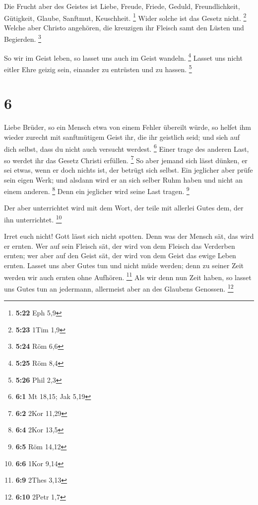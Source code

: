  Die Frucht aber des Geistes ist Liebe, Freude, Friede,
Geduld, Freundlichkeit, Gütigkeit, Glaube, Sanftmut, Keuschheit.
\footnote{\textbf{5:22} Eph 5,9}  Wider solche ist das
Gesetz nicht. \footnote{\textbf{5:23} 1Tim 1,9}  Welche
aber Christo angehören, die kreuzigen ihr Fleisch samt den Lüsten und
Begierden. \footnote{\textbf{5:24} Röm 6,6}

 So wir im Geist leben, so lasset uns auch im Geist
wandeln. \footnote{\textbf{5:25} Röm 8,4}  Lasset uns nicht
eitler Ehre geizig sein, einander zu entrüsten und zu hassen.
\footnote{\textbf{5:26} Phil 2,3}

\hypertarget{section-1}{%
\section{6}\label{section-1}}

 Liebe Brüder, so ein Mensch etwa von einem Fehler übereilt
würde, so helfet ihm wieder zurecht mit sanftmütigem Geist ihr, die ihr
geistlich seid; und sieh auf dich selbst, dass du nicht auch versucht
werdest. \footnote{\textbf{6:1} Mt 18,15; Jak 5,19}  Einer
trage des anderen Last, so werdet ihr das Gesetz Christi erfüllen.
\footnote{\textbf{6:2} 2Kor 11,29}  So aber jemand sich
lässt dünken, er sei etwas, wenn er doch nichts ist, der betrügt sich
selbst.  Ein jeglicher aber prüfe sein eigen Werk; und
alsdann wird er an sich selber Ruhm haben und nicht an einem anderen.
\footnote{\textbf{6:4} 2Kor 13,5}  Denn ein jeglicher wird
seine Last tragen. \footnote{\textbf{6:5} Röm 14,12}

 Der aber unterrichtet wird mit dem Wort, der teile mit
allerlei Gutes dem, der ihn unterrichtet. \footnote{\textbf{6:6} 1Kor
  9,14}

 Irret euch nicht! Gott lässt sich nicht spotten. Denn was
der Mensch sät, das wird er ernten.  Wer auf sein Fleisch
sät, der wird von dem Fleisch das Verderben ernten; wer aber auf den
Geist sät, der wird von dem Geist das ewige Leben ernten. 
Lasset uns aber Gutes tun und nicht müde werden; denn zu seiner Zeit
werden wir auch ernten ohne Aufhören. \footnote{\textbf{6:9} 2Thes 3,13}
 Als wir denn nun Zeit haben, so lasset uns Gutes tun an
jedermann, allermeist aber an des Glaubens Genossen. \footnote{\textbf{6:10}
  2Petr 1,7}

